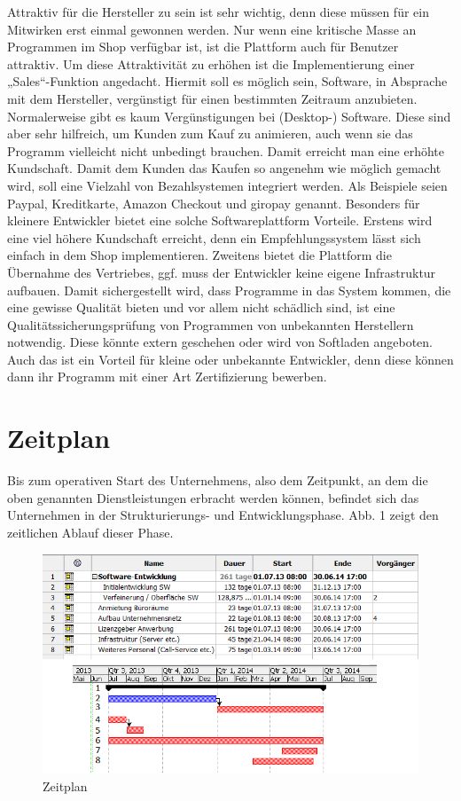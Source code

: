 Attraktiv für die Hersteller zu sein ist sehr wichtig, denn diese müssen für ein Mitwirken erst einmal gewonnen werden. 
Nur wenn eine kritische Masse an Programmen im Shop verfügbar ist, ist die Plattform auch für Benutzer attraktiv. Um diese Attraktivität zu erhöhen ist die Implementierung einer „Sales“-Funktion angedacht. Hiermit soll es möglich sein, Software, in Absprache mit dem Hersteller, vergünstigt für einen bestimmten Zeitraum anzubieten. Normalerweise gibt es kaum Vergünstigungen bei (Desktop-) Software. Diese sind aber sehr hilfreich, um Kunden zum Kauf zu animieren, auch wenn sie das Programm vielleicht nicht unbedingt brauchen. Damit erreicht man eine erhöhte Kundschaft. Damit dem Kunden das Kaufen so angenehm wie möglich gemacht wird, soll eine Vielzahl von Bezahlsystemen integriert werden. Als Beispiele seien Paypal, Kreditkarte, Amazon Checkout und giropay genannt.
Besonders für kleinere Entwickler bietet eine solche Softwareplattform Vorteile. Erstens wird eine viel höhere Kundschaft erreicht, denn ein Empfehlungssystem lässt sich einfach in dem Shop implementieren. Zweitens bietet die Plattform die Übernahme des Vertriebes, ggf. muss der Entwickler keine eigene Infrastruktur aufbauen. Damit sichergestellt wird, dass Programme in das System kommen, die eine gewisse Qualität bieten und vor allem nicht schädlich sind, ist eine Qualitätssicherungsprüfung von Programmen von unbekannten Herstellern notwendig. Diese könnte extern geschehen oder wird von Softladen angeboten. Auch das ist ein Vorteil für kleine oder unbekannte Entwickler, denn diese können dann ihr Programm mit einer Art Zertifizierung bewerben.
				
\section{Zeitplan}

Bis zum operativen Start des Unternehmens, also dem Zeitpunkt, an dem die oben genannten Dienstleistungen erbracht werden können, befindet sich das Unternehmen in der Strukturierungs- und Entwicklungsphase. Abb. 1 zeigt den zeitlichen Ablauf dieser  Phase.

\begin{figure}[h]
         \centering
                 \includegraphics[scale=1.00]{zeitplan.png}
                 \caption{Zeitplan}
         \label{fig:NM}
 \end{figure}

